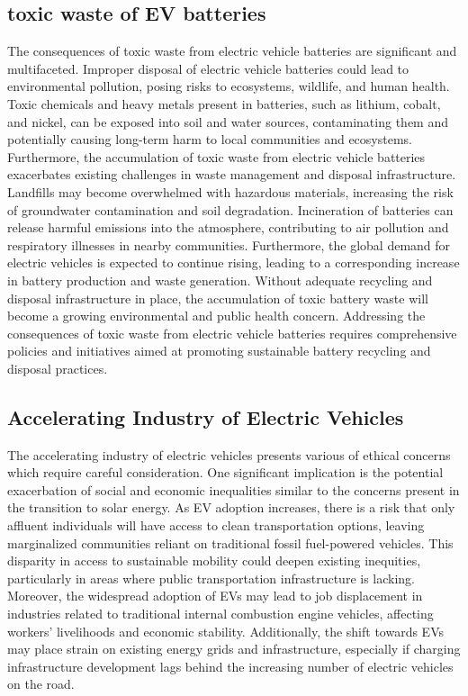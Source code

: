 \documentclass[10pt,twocolumn]{article}
\begin{document}
\subsection{toxic waste of EV batteries}

The consequences of toxic waste from electric vehicle batteries are significant and multifaceted. Improper disposal of electric vehicle batteries could lead to environmental pollution, posing risks to ecosystems, wildlife, and human health. Toxic chemicals and heavy metals present in batteries, such as lithium, cobalt, and nickel, can be exposed into soil and water sources, contaminating them and potentially causing long-term harm to local communities and ecosystems. Furthermore, the accumulation of toxic waste from electric vehicle batteries exacerbates existing challenges in waste management and disposal infrastructure. Landfills may become overwhelmed with hazardous materials, increasing the risk of groundwater contamination and soil degradation. Incineration of batteries can release harmful emissions into the atmosphere, contributing to air pollution and respiratory illnesses in nearby communities. Furthermore, the global demand for electric vehicles is expected to continue rising, leading to a corresponding increase in battery production and waste generation. Without adequate recycling and disposal infrastructure in place, the accumulation of toxic battery waste will become a growing environmental and public health concern. Addressing the consequences of toxic waste from electric vehicle  batteries requires comprehensive policies and initiatives aimed at promoting sustainable battery recycling and disposal practices. 

\subsection{Accelerating Industry of Electric Vehicles}
The accelerating industry of electric vehicles presents various of ethical concerns which require careful consideration. One significant implication is the potential exacerbation of social and economic inequalities similar to the concerns present in the transition to solar energy. As EV adoption increases, there is a risk that only affluent individuals will have access to clean transportation options, leaving marginalized communities reliant on traditional fossil fuel-powered vehicles. This disparity in access to sustainable mobility could deepen existing inequities, particularly in areas where public transportation infrastructure is lacking. Moreover, the widespread adoption of EVs may lead to job displacement in industries related to traditional internal combustion engine vehicles, affecting workers' livelihoods and economic stability. Additionally, the shift towards EVs may place strain on existing energy grids and infrastructure, especially if charging infrastructure development lags behind the increasing number of electric vehicles on the road. 
\end{document}
